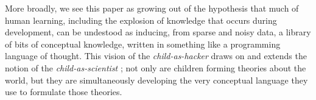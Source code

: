 \documentclass[10pt,letterpaper]{article}
\begin{document}
More broadly, we see this paper as growing out of the hypothesis that
much of human learning, including the explosion of knowledge that
occurs during development, can be undestood as inducing, from sparse
and noisy data, a library of bits of conceptual knowledge, written in
something like a programming language of thought. This vision of the
\emph{child-as-hacker} draws on and extends the notion of the
\emph{child-as-scientist} \citep{gopnik1996scientist}; not only are
children forming theories about the world, but they are simultaneously
developing the very conceptual language they use to formulate those
theories.





\setlength{\bibleftmargin}{.125in}
\setlength{\bibindent}{-\bibleftmargin}

\end{document}
